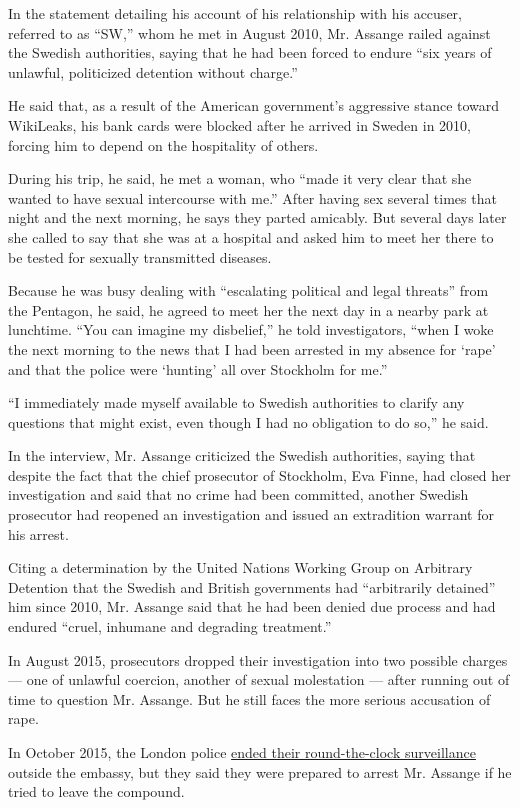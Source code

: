 In the statement detailing his account of his relationship with his
accuser, referred to as ``SW,'' whom he met in August 2010, Mr. Assange
railed against the Swedish authorities, saying that he had been forced
to endure ``six years of unlawful, politicized detention without
charge.''

He said that, as a result of the American government's aggressive stance
toward WikiLeaks, his bank cards were blocked after he arrived in Sweden
in 2010, forcing him to depend on the hospitality of others.

During his trip, he said, he met a woman, who ``made it very clear that
she wanted to have sexual intercourse with me.'' After having sex
several times that night and the next morning, he says they parted
amicably. But several days later she called to say that she was at a
hospital and asked him to meet her there to be tested for sexually
transmitted diseases.

Because he was busy dealing with ``escalating political and legal
threats'' from the Pentagon, he said, he agreed to meet her the next day
in a nearby park at lunchtime. ``You can imagine my disbelief,'' he told
investigators, ``when I woke the next morning to the news that I had
been arrested in my absence for `rape' and that the police were
`hunting' all over Stockholm for me.''

``I immediately made myself available to Swedish authorities to clarify
any questions that might exist, even though I had no obligation to do
so,'' he said.

In the interview, Mr. Assange criticized the Swedish authorities, saying
that despite the fact that the chief prosecutor of Stockholm, Eva Finne,
had closed her investigation and said that no crime had been committed,
another Swedish prosecutor had reopened an investigation and issued an
extradition warrant for his arrest.

Citing a determination by the United Nations Working Group on Arbitrary
Detention that the Swedish and British governments had ``arbitrarily
detained'' him since 2010, Mr. Assange said that he had been denied due
process and had endured ``cruel, inhumane and degrading treatment.''

In August 2015, prosecutors dropped their investigation into two
possible charges --- one of unlawful coercion, another of sexual
molestation --- after running out of time to question Mr. Assange. But
he still faces the more serious accusation of rape.

In October 2015, the London police
\href{http://www.nytimes.com/2015/10/13/world/europe/london-police-end-24-hour-watch-at-embassy-housing-julian-assange.html}{ended
their round-the-clock surveillance} outside the embassy, but they said
they were prepared to arrest Mr. Assange if he tried to leave the
compound.

